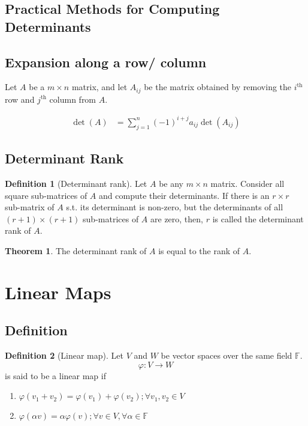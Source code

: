 \documentclass[fleqn, a4paper, 12pt]{article}
\theoremstyle{definition}
\newtheorem{definition}{Definition} %
\theoremstyle{theorem}
\newtheorem{theorem}{Theorem} %
\theoremstyle{remark}
\numberwithin{corollary}{theorem}
\numberwithin{equation}{theorem}
\begin{document}
\subsection{Practical Methods for Computing Determinants}

\subsection{Expansion along a row/ column}

Let $A$ be a $m \times n$ matrix, and let $A_{ij}$ be the matrix obtained by removing the $i^{\text{th}}$ row and $j^{\text{th}}$ column from $A$.

\begin{align*}
	\det (A) &= \sum_{j = 1}^{n} (-1)^{i + j} a_{ij} \det (A_{ij})
\end{align*}

\subsection{Determinant Rank}

\begin{definition}[Determinant rank]
	Let $A$ be any $m \times n$ matrix. Consider all square sub-matrices of $A$ and compute their determinants. If there is an $r \times r$ sub-matrix of $A$ s.t. its determinant is non-zero, but the determinants of all $(r + 1) \times (r + 1)$ sub-matrices of $A$ are zero, then, $r$ is called the determinant rank of $A$.
\end{definition}

\begin{theorem}
	The determinant rank of $A$ is equal to the rank of $A$.
\end{theorem}

\section{Linear Maps}

\subsection{Definition}

\begin{definition}[Linear map]
	Let $V$ and $W$ be vector spaces over the same field $\mathbb{F}$. 
	\begin{equation*}
		\varphi : V \to W
	\end{equation*}
	is said to be a linear map if
	\begin{enumerate}
		\item $\varphi(v_1 + v_2) = \varphi(v_1) + \varphi(v_2) ; \forall v_1, v_2 \in V$
		\item $\varphi(\alpha v) = \alpha \varphi(v) ; \forall v \in V, \forall \alpha \in \mathbb{F}$
	\end{enumerate}
\end{definition}
\end{document}
